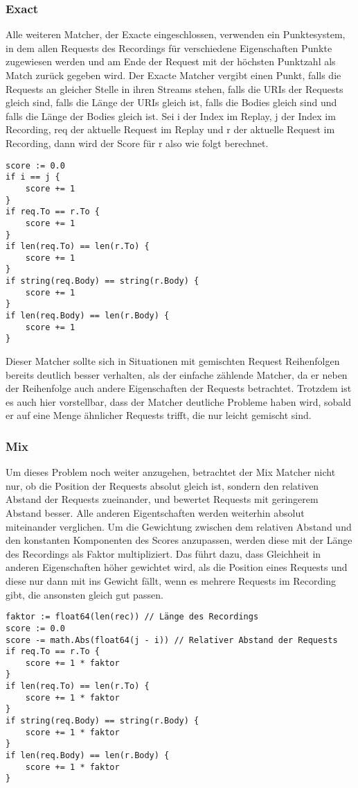 \documentclass[a4paper]{report}
\begin{document}
\subsubsection{Exact}
Alle weiteren Matcher, der Exacte eingeschlossen, verwenden ein Punktesystem, in dem allen Requests des Recordings für verschiedene
Eigenschaften Punkte zugewiesen werden und am Ende der Request mit der höchsten Punktzahl als Match zurück gegeben wird.
Der Exacte Matcher vergibt einen Punkt, falls die Requests an gleicher Stelle in ihren Streams stehen, falls die URIs der
Requests gleich sind, falls die Länge der URIs gleich ist, falls die Bodies gleich sind und falls die Länge der Bodies gleich ist.
Sei i der Index im Replay, j der Index im Recording, req der aktuelle Request im Replay und r der aktuelle
Request im Recording, dann wird der Score für r also wie folgt berechnet.
\begin{verbatim}
score := 0.0
if i == j {
    score += 1
}
if req.To == r.To {
    score += 1
}
if len(req.To) == len(r.To) {
    score += 1
}
if string(req.Body) == string(r.Body) {
    score += 1
}
if len(req.Body) == len(r.Body) {
    score += 1
}
\end{verbatim}
Dieser Matcher sollte sich in Situationen mit gemischten Request Reihenfolgen bereits deutlich besser verhalten, als der
einfache zählende Matcher, da er neben der Reihenfolge auch andere Eigenschaften der Requests betrachtet. Trotzdem ist es auch
hier vorstellbar, dass der Matcher deutliche Probleme haben wird, sobald er auf eine Menge ähnlicher Requests trifft, die nur
leicht gemischt sind.
\subsubsection{Mix}
Um dieses Problem noch weiter anzugehen, betrachtet der Mix Matcher nicht nur, ob die Position der Requests absolut gleich
ist, sondern den relativen Abstand der Requests zueinander, und bewertet Requests mit geringerem Abstand besser. Alle
anderen Eigentschaften werden weiterhin absolut miteinander verglichen. Um die Gewichtung zwischen dem relativen Abstand
und den konstanten Komponenten des Scores anzupassen, werden diese mit der Länge des Recordings als Faktor multipliziert.
Das führt dazu, dass Gleichheit in anderen Eigenschaften höher gewichtet wird, als die Position eines Requests und diese
nur dann mit ins Gewicht fällt, wenn es mehrere Requests im Recording gibt, die ansonsten gleich gut passen.
\begin{verbatim}
faktor := float64(len(rec)) // Länge des Recordings
score := 0.0
score -= math.Abs(float64(j - i)) // Relativer Abstand der Requests
if req.To == r.To {
    score += 1 * faktor
}
if len(req.To) == len(r.To) {
    score += 1 * faktor
}
if string(req.Body) == string(r.Body) {
    score += 1 * faktor
}
if len(req.Body) == len(r.Body) {
    score += 1 * faktor
}
\end{verbatim}
\end{document}
